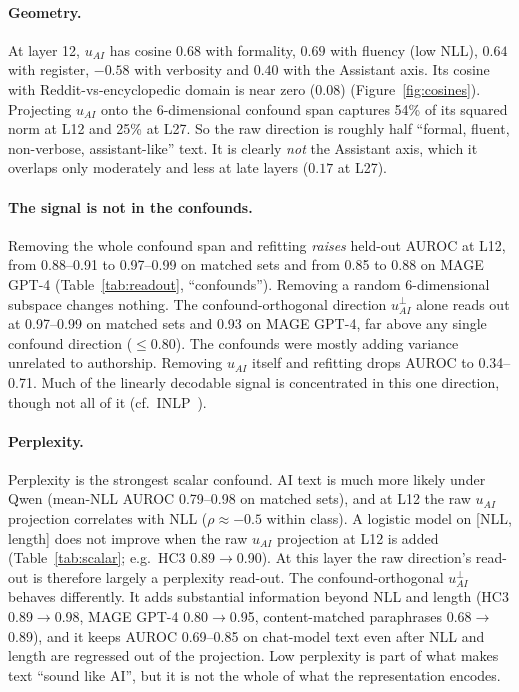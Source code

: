 \paragraph{Geometry.} At layer 12, $u_{AI}$ has cosine $0.68$ with formality, $0.69$ with fluency (low NLL), $0.64$ with register, $-0.58$ with verbosity and $0.40$ with the Assistant axis. Its cosine with Reddit-vs-encyclopedic domain is near zero (0.08) (Figure~\ref{fig:cosines}). Projecting $u_{AI}$ onto the 6-dimensional confound span captures 54\% of its squared norm at L12 and 25\% at L27. So the raw direction is roughly half ``formal, fluent, non-verbose, assistant-like'' text. It is clearly \emph{not} the Assistant axis, which it overlaps only moderately and less at late layers ($0.17$ at L27).

\paragraph{The signal is not in the confounds.} Removing the whole confound span and refitting \emph{raises} held-out AUROC at L12, from 0.88--0.91 to 0.97--0.99 on matched sets and from 0.85 to 0.88 on MAGE GPT-4 (Table~\ref{tab:readout}, ``confounds''). Removing a random 6-dimensional subspace changes nothing. The confound-orthogonal direction $u_{AI}^{\perp}$ alone reads out at 0.97--0.99 on matched sets and 0.93 on MAGE GPT-4, far above any single confound direction ($\leq 0.80$). The confounds were mostly adding variance unrelated to authorship. Removing $u_{AI}$ itself and refitting drops AUROC to 0.34--0.71. Much of the linearly decodable signal is concentrated in this one direction, though not all of it (cf.\ INLP~\citep{ravfogel2020null}).

\paragraph{Perplexity.} Perplexity is the strongest scalar confound. AI text is much more likely under Qwen (mean-NLL AUROC 0.79--0.98 on matched sets), and at L12 the raw $u_{AI}$ projection correlates with NLL ($\rho\approx-0.5$ within class). A logistic model on [NLL, length] does not improve when the raw $u_{AI}$ projection at L12 is added (Table~\ref{tab:scalar}; e.g.\ HC3 0.89$\rightarrow$0.90). At this layer the raw direction's read-out is therefore largely a perplexity read-out. The confound-orthogonal $u_{AI}^{\perp}$ behaves differently. It adds substantial information beyond NLL and length (HC3 0.89$\rightarrow$0.98, MAGE GPT-4 0.80$\rightarrow$0.95, content-matched paraphrases 0.68$\rightarrow$0.89), and it keeps AUROC 0.69--0.85 on chat-model text even after NLL and length are regressed out of the projection. Low perplexity is part of what makes text ``sound like AI'', but it is not the whole of what the representation encodes.

